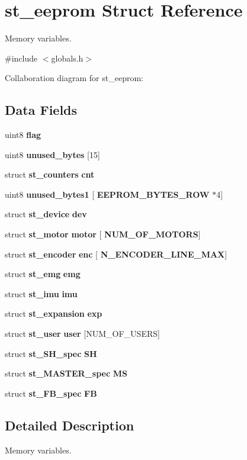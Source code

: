 \section{st\+\_\+eeprom Struct Reference}
\label{structst__eeprom}


Memory variables.  




{\ttfamily \#include $<$globals.\+h$>$}



Collaboration diagram for st\+\_\+eeprom\+:
\subsection*{Data Fields}
\begin{DoxyCompactItemize}
\item 
uint8 \textbf{ flag}
\item 
uint8 \textbf{ unused\+\_\+bytes} [15]
\item 
struct \textbf{ st\+\_\+counters} \textbf{ cnt}
\item 
uint8 \textbf{ unused\+\_\+bytes1} [\textbf{ E\+E\+P\+R\+O\+M\+\_\+\+B\+Y\+T\+E\+S\+\_\+\+R\+OW} $\ast$4]
\item 
struct \textbf{ st\+\_\+device} \textbf{ dev}
\item 
struct \textbf{ st\+\_\+motor} \textbf{ motor} [\textbf{ N\+U\+M\+\_\+\+O\+F\+\_\+\+M\+O\+T\+O\+RS}]
\item 
struct \textbf{ st\+\_\+encoder} \textbf{ enc} [\textbf{ N\+\_\+\+E\+N\+C\+O\+D\+E\+R\+\_\+\+L\+I\+N\+E\+\_\+\+M\+AX}]
\item 
struct \textbf{ st\+\_\+emg} \textbf{ emg}
\item 
struct \textbf{ st\+\_\+imu} \textbf{ imu}
\item 
struct \textbf{ st\+\_\+expansion} \textbf{ exp}
\item 
struct \textbf{ st\+\_\+user} \textbf{ user} [N\+U\+M\+\_\+\+O\+F\+\_\+\+U\+S\+E\+RS]
\item 
struct \textbf{ st\+\_\+\+S\+H\+\_\+spec} \textbf{ SH}
\item 
struct \textbf{ st\+\_\+\+M\+A\+S\+T\+E\+R\+\_\+spec} \textbf{ MS}
\item 
struct \textbf{ st\+\_\+\+F\+B\+\_\+spec} \textbf{ FB}
\end{DoxyCompactItemize}


\subsection{Detailed Description}
Memory variables. 



